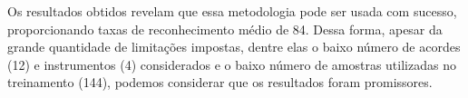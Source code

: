 Os resultados obtidos revelam que essa metodologia pode ser usada com sucesso, proporcionando taxas de reconhecimento médio de 84. Dessa forma, apesar da grande quantidade de limitações impostas, dentre elas o baixo número de acordes (12) e instrumentos (4) considerados e o baixo número de amostras utilizadas no treinamento (144), podemos considerar que os resultados foram promissores.













